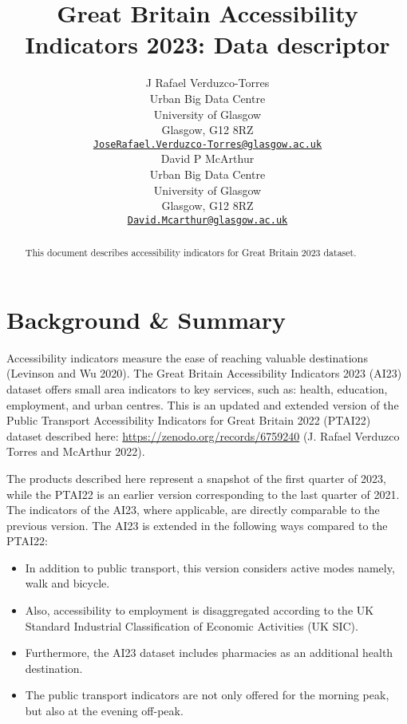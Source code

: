 \documentclass{article}
\title{Great Britain Accessibility Indicators 2023: Data descriptor}
\author{
    J Rafael Verduzco-Torres
   \\
    Urban Big Data Centre \\
    University of Glasgow \\
  Glasgow, G12 8RZ \\
  \texttt{\href{mailto:JoseRafael.Verduzco-Torres@glasgow.ac.uk}{\nolinkurl{JoseRafael.Verduzco-Torres@glasgow.ac.uk}}} \\
   \And
    David P McArthur
   \\
    Urban Big Data Centre \\
    University of Glasgow \\
  Glasgow, G12 8RZ \\
  \texttt{\href{mailto:David.Mcarthur@glasgow.ac.uk}{\nolinkurl{David.Mcarthur@glasgow.ac.uk}}} \\
  }
\providecommand{\tightlist}{%
  \setlength{\itemsep}{0pt}\setlength{\parskip}{0pt}}
\begin{document}
\maketitle


\begin{abstract}
This document describes accessibility indicators for Great Britain 2023
dataset.
\end{abstract}


\hypertarget{background-summary}{%
\section{Background \& Summary}\label{background-summary}}

Accessibility indicators measure the ease of reaching valuable
destinations (Levinson and Wu 2020). The Great Britain Accessibility
Indicators 2023 (AI23) dataset offers small area indicators to key
services, such as: health, education, employment, and urban centres.
This is an updated and extended version of the Public Transport
Accessibility Indicators for Great Britain 2022 (PTAI22) dataset
described here: \url{https://zenodo.org/records/6759240} (J. Rafael
Verduzco Torres and McArthur 2022).

The products described here represent a snapshot of the first quarter of
2023, while the PTAI22 is an earlier version corresponding to the last
quarter of 2021. The indicators of the AI23, where applicable, are
directly comparable to the previous version. The AI23 is extended in the
following ways compared to the PTAI22:

\begin{itemize}
\tightlist
\item
  In addition to public transport, this version considers active modes
  namely, walk and bicycle.
\item
  Also, accessibility to employment is disaggregated according to the UK
  Standard Industrial Classification of Economic Activities (UK SIC).
\item
  Furthermore, the AI23 dataset includes pharmacies as an additional
  health destination.
\item
  The public transport indicators are not only offered for the morning
  peak, but also at the evening off-peak.
\end{itemize}
\end{document}

